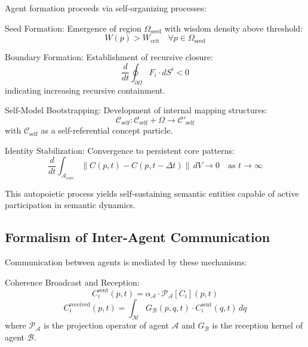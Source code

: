 Agent formation proceeds via self-organizing processes:

Seed Formation: Emergence of region \(\Omega_{\mathrm{seed}}\) with wisdom density above threshold:
\begin{equation}
W(p) > W_{\mathrm{crit}} \quad \forall p \in \Omega_{\mathrm{seed}}
\end{equation}

Boundary Formation: Establishment of recursive closure:
\begin{equation}
\frac{d}{dt}\oint_{\partial \Omega} F_i \cdot dS^i < 0
\end{equation}
indicating increasing recursive containment.

Self-Model Bootstrapping: Development of internal mapping structures:
\begin{equation}
\mathcal{C}_{\mathrm{self}} : \mathcal{C}_{\mathrm{self}} + \Omega \to \mathcal{C}'_{\mathrm{self}}
\end{equation}
with \(\mathcal{C}_{\mathrm{self}}\) as a self-referential concept particle.

Identity Stabilization: Convergence to persistent core patterns:
\begin{equation}
\frac{d}{dt}\int_{\mathcal{A}_{\mathrm{core}}} \|C(p,t) - C(p,t-\Delta t)\| \, dV \to 0 \quad \text{as } t \to \infty
\end{equation}

This autopoietic process yields self-sustaining semantic entities capable of active participation in semantic dynamics.

\subsection{Formalism of Inter-Agent Communication}

Communication between agents is mediated by these mechanisms:

Coherence Broadcast and Reception:
\begin{equation}
C_i^{\mathrm{sent}}(p,t) = \alpha_{\mathcal{A}} \cdot \mathcal{P}_{\mathcal{A}}[C_i](p,t)
\end{equation}
\begin{equation}
C_i^{\mathrm{received}}(p,t) = \int_{\mathcal{M}} G_{\mathcal{B}}(p,q,t) \cdot C_i^{\mathrm{sent}}(q,t) \, dq
\end{equation}
where \(\mathcal{P}_{\mathcal{A}}\) is the projection operator of agent \(\mathcal{A}\) and \(G_{\mathcal{B}}\) is the reception kernel of agent \(\mathcal{B}\).

